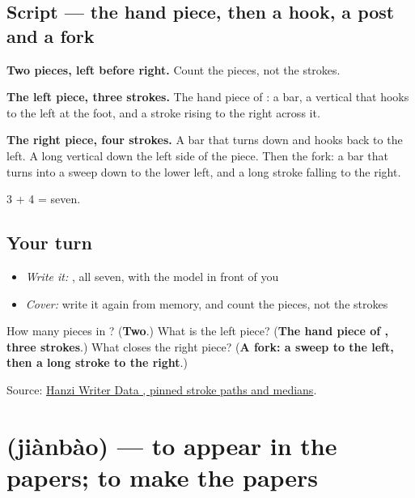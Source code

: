 \subsection*{Script — the hand piece, then a hook, a post and a fork}

\begin{quote}
\end{quote}

\textbf{Two pieces, left before right.} Count the pieces, not the strokes.

\textbf{The left piece, three strokes.} The hand piece of : a bar, a vertical that hooks to the left at the foot, and a stroke rising to the right across it.

\textbf{The right piece, four strokes.} A bar that turns down and hooks back to the left. A long vertical down the left side of the piece. Then the fork: a bar that turns into a sweep down to the lower left, and a long stroke falling to the right.

3 + 4 = seven.

\subsection*{Your turn}
\begin{itemize}
\raggedright
  \item \emph{Write it:} , all seven, with the model in front of you
  \item \emph{Cover:} write it again from memory, and count the pieces, not the strokes
\end{itemize}

\begin{tcolorbox}[breakable,colback=teal!4,colframe=teal!35!black,title={Before you move on}]
How many pieces in ? (\textbf{Two}.) What is the left piece? (\textbf{The hand piece of , three strokes}.) What closes the right piece? (\textbf{A fork: a sweep to the left, then a long stroke to the right}.)

Source: \href{https://raw.githubusercontent.com/chanind/hanzi-writer-data/68d10a4b21150cae5e1ebbd223eed289cf32d90c/data/\%E6\%8A\%A5.json}{Hanzi Writer Data , pinned stroke paths and medians}.
\end{tcolorbox}
\section[\texorpdfstring{\zh{见报} (jiànbào)}{见报 (jiànbào)}]{ (jiànbào) — to appear in the papers; to make the papers}

